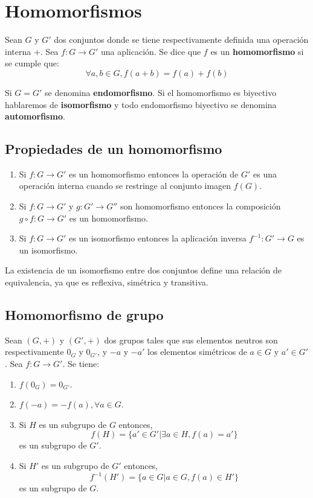 \section{Homomorfismos}

Sean $G$ y $G'$ dos conjuntos donde se tiene respectivamente definida una operación interna $+$. Sea $f: G \longrightarrow G'$ una aplicación. Se dice que $f$ es un \textbf{homomorfismo} si se cumple que:
\[
\forall a,b \in G, f(a+b) = f(a) + f(b)
\]

Si $G=G'$ se denomina \textbf{endomorfismo}. Si el homomorfismo es biyectivo hablaremos de \textbf{isomorfismo} y todo endomorfismo biyectivo se denomina \textbf{automorfismo}.

\subsection{Propiedades de un homomorfismo}

\begin{enumerate}
	\item Si $f: G \longrightarrow G'$ es un homomorfismo entonces la operación de $G'$ es una operación interna cuando se restringe al conjunto imagen $f(G)$.
	\item Si $f: G \longrightarrow G'$ y $g: G' \longrightarrow G''$ son homomorfismo entonces la composición $g \circ f: G \longrightarrow G'$ es un homomorfismo.
	\item Si $f: G \longrightarrow G'$ es un isomorfismo entonces la aplicación inversa $f^{-1}: G' \longrightarrow G$ es un isomorfismo.
\end{enumerate}

La existencia de un isomorfismo entre dos conjuntos define una relación de equivalencia, ya que es reflexiva, simétrica y transitiva.

\subsection{Homomorfismo de grupo}

Sean $(G,+)$ y $(G',+)$ dos grupos tales que sus elementos neutros son respectivamente $0_G$ y $0_{G'}$, y $-a$ y $-a'$ los elementos simétricos de $a \in G$ y $a' \in G'$. Sea $f: G \longrightarrow G'$. Se tiene:
\begin{enumerate}
	\item $f(0_G)=0_{G'}$.
	\item $f(-a)=-f(a), \forall a \in G$.
	\item Si $H$ es un subgrupo de $G$ entonces,
	\[
	f(H)=\{a' \in G'| \exists a \in H, f(a)=a'\}
	\]
	es un subgrupo de $G'$.
	\item Si $H'$ es un subgrupo de $G'$ entonces,
	\[
	f^{-1}(H')=\{a \in G| a \in G, f(a) \in H'\}
	\]
	es un subgrupo de $G$.
\end{enumerate}

